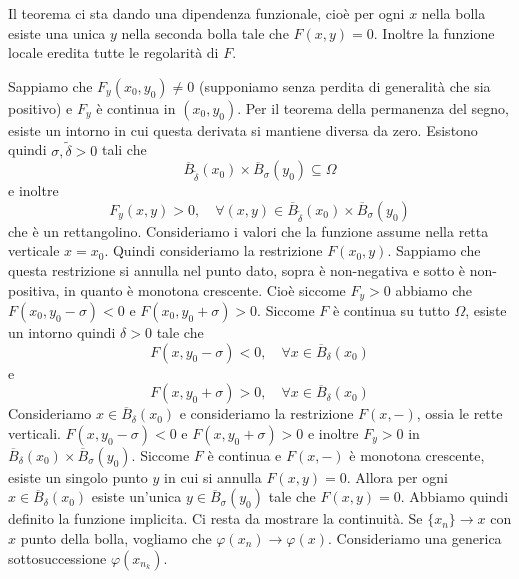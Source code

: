 \documentclass[a4paper]{article}
\begin{document}
\begin{radioactive}
Il teorema ci sta dando una dipendenza funzionale,
cioè per ogni \(x\) nella bolla esiste una unica \(y\) nella seconda bolla tale che \(F(x,y) =0\).
Inoltre la funzione locale eredita tutte le regolarità di \(F\).
\end{radioactive}

\begin{radioactive}
\begin{snippetproof}{}
    Sappiamo che \(F_y(x_0,y_0) \neq 0\)
    (supponiamo senza perdita di generalità che sia positivo)
    e \(F_y\) è continua in \((x_0, y_0)\).
    Per il teorema della permanenza del segno, esiste un intorno in cui questa derivata si mantiene
    diversa da zero.
    Esistono quindi \(\sigma, \tilde{\delta} > 0\) tali che
    \[
        \overline{B}_{\tilde{\delta}}(x_0)
        \times
        \overline{B}_{\sigma}(y_0) \subseteq \Omega
    \]
    e inoltre
    \[
        F_y(x,y) > 0, \quad
        \forall (x,y) \in \overline{B}_{\tilde{\delta}}(x_0) \times
        \overline{B}_{\sigma}(y_0)
    \]
    che è un rettangolino.
    Consideriamo i valori che la funzione assume nella retta verticale \(x=x_0\).
    Quindi consideriamo la restrizione \(F(x_0, y)\).
    Sappiamo che questa restrizione si annulla nel punto dato,
    sopra è non-negativa e sotto è non-positiva, in quanto è monotona crescente.
    Cioè siccome \(F_y > 0\) abbiamo che
    \(F(x_0, y_0 - \sigma) < 0\) e \(F(x_0, y_0 + \sigma)>0\).
    Siccome \(F\) è continua su tutto \(\Omega\),
    esiste un intorno quindi \(\delta>0\) tale che
    \[
        F(x, y_0 - \sigma) < 0, \quad \forall x \in \overline{B}_{\delta}(x_0)
    \]
    e
    \[
        F(x, y_0 + \sigma) > 0, \quad \forall x \in \overline{B}_{\delta}(x_0)
    \]
    Consideriamo \(x \in \overline{B}_\delta(x_0)\)
    e consideriamo la restrizione \(F(x, -)\), ossia le rette verticali.
    \(F(x, y_0 - \sigma) < 0\)
    e \(F(x, y_0 + \sigma) > 0\) e inoltre \(F_y > 0\)
    in \(\overline{B}_{\delta}(x_0) \times \overline{B}_{\sigma}(y_0)\).
    Siccome \(F\) è continua e \(F(x, -)\) è monotona crescente, esiste un singolo punto
    \(y\) in cui si annulla \(F(x,y)=0\).
    Allora per ogni \(x \in \overline{B}_\delta(x_0)\)
    esiste un'unica \(y \in \overline{B}_\sigma(y_0)\)
    tale che \(F(x,y)=0\).
    Abbiamo quindi definito la funzione implicita.
    Ci resta da mostrare la continuità.
    Se \(\{x_n\} \to x\) con \(x\) punto della bolla,
    vogliamo che \(\varphi(x_n) \to \varphi(x)\).
    Consideriamo una generica sottosuccessione \(\varphi(x_{n_k})\).

\end{snippetproof}
\end{radioactive}
\end{document}
